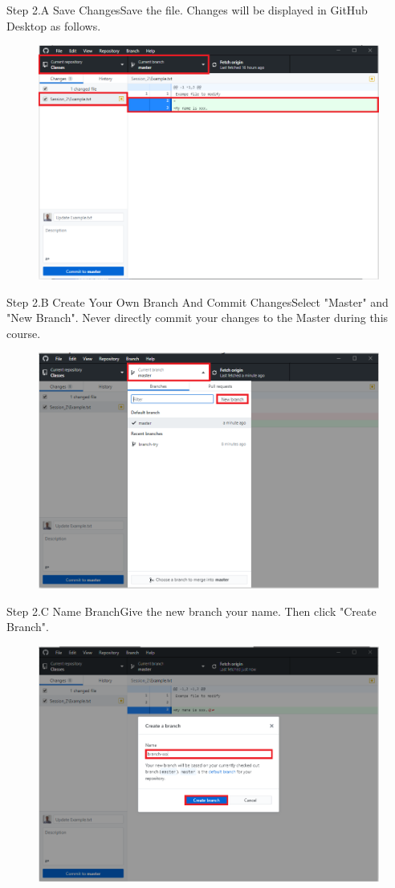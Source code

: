 \documentclass[aspectratio=169]{beamer}
\begin{document}
\begin{frame}{Step 2.A Save Changes}{Save the file. Changes will be displayed in GitHub Desktop as follows.}
	\begin{figure}
		\centering
		\includegraphics[width=0.7\linewidth]{../images/step2.A}
	\end{figure}
\end{frame}

\begin{frame}{Step 2.B Create Your Own Branch And Commit Changes}{Select "Master" and "New Branch". Never directly commit your changes to the Master during this course.}
	\begin{figure}
		\centering
		\includegraphics[width=0.7\linewidth]{../images/step2.B}
	\end{figure}
\end{frame}


\begin{frame}{Step 2.C Name Branch}{Give the new branch your name. Then click "Create Branch".}
	\begin{figure}
		\centering
		\includegraphics[width=0.7\linewidth]{../images/step2.C}
	\end{figure}
\end{frame}
\end{document}
